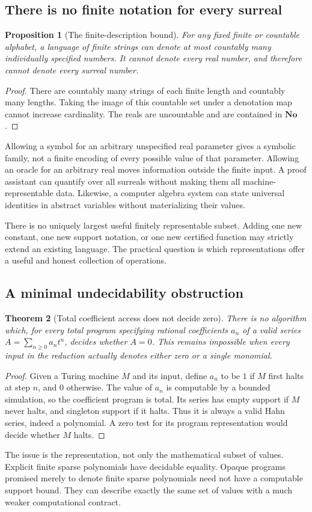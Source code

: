 \documentclass[11pt,letterpaper]{article}
\numberwithin{equation}{section}
\newtheorem{theorem}{Theorem}[section]
\newtheorem{proposition}[theorem]{Proposition}
\theoremstyle{definition}
\theoremstyle{remark}\newtheorem{remark}[theorem]{Remark}
\newcommand{\No}{\mathbf{No}}
\begin{document}
\subsection{There is no finite notation for every surreal}
\begin{proposition}[The finite-description bound]\label{prop:countable}
For any fixed finite or countable alphabet, a language of finite strings
can denote at most countably many individually specified numbers. It cannot
denote every real number, and therefore cannot denote every surreal number.
\end{proposition}
\begin{proof}
There are countably many strings of each finite length and countably many
lengths. Taking the image of this countable set under a denotation map
cannot increase cardinality. The reals are uncountable and are contained in
$\No$.
\end{proof}
Allowing a symbol for an arbitrary unspecified real parameter gives a symbolic
family, not a finite encoding of every possible value of that parameter.
Allowing an oracle for an arbitrary real moves information outside the finite
input. A proof assistant can quantify over all surreals without making them
all machine-representable data. Likewise, a computer algebra system can state
universal identities in abstract variables without materializing their values.

There is no uniquely largest useful finitely representable subset. Adding one
new constant, one new support notation, or one new certified function may
strictly extend an existing language. The practical question is which
representations offer a useful and honest collection of operations.

\subsection{A minimal undecidability obstruction}
\begin{theorem}[Total coefficient access does not decide zero]
\label{thm:undecidable}
There is no algorithm which, for every total program specifying rational
coefficients $a_n$ of a valid series $A=\sum_{n\ge0}a_nt^n$, decides whether
$A=0$. This remains impossible when every input in the reduction actually
denotes either zero or a single monomial.
\end{theorem}
\begin{proof}
Given a Turing machine $M$ and its input, define $a_n$ to be $1$ if $M$
first halts at step $n$, and $0$ otherwise. The value of $a_n$ is computable
by a bounded simulation, so the coefficient program is total. Its series has
empty support if $M$ never halts, and singleton support if it halts. Thus it
is always a valid Hahn series, indeed a polynomial. A zero test for its
program representation would decide whether $M$ halts.
\end{proof}
The issue is the representation, not only the mathematical subset of values.
Explicit finite sparse polynomials have decidable equality. Opaque programs
promised merely to denote finite sparse polynomials need not have a computable
support bound. They can describe exactly the same set of values with a much
weaker computational contract.
\end{document}
